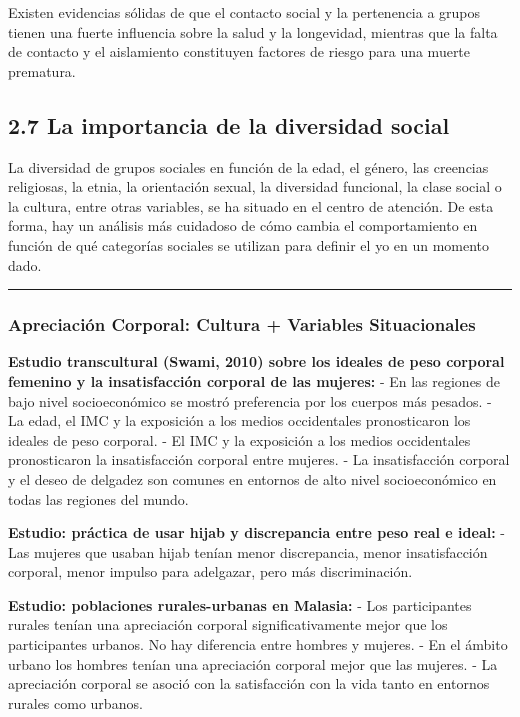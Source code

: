 \documentclass[
]{website}
\begin{document}
Existen evidencias sólidas de que el contacto social y la pertenencia a grupos tienen una fuerte influencia sobre la salud y la longevidad, mientras que la falta de contacto y el aislamiento constituyen factores de riesgo para una muerte prematura.

\subsection*{2.7 La importancia de la diversidad social}\label{subtema2_7}

La diversidad de grupos sociales en función de la edad, el género, las creencias religiosas, la etnia, la orientación sexual, la diversidad funcional, la clase social o la cultura, entre otras variables, se ha situado en el centro de atención. De esta forma, hay un análisis más cuidadoso de cómo cambia el comportamiento en función de qué categorías sociales se utilizan para definir el yo en un momento dado.

\begin{center}\rule{0.5\linewidth}{0.5pt}\end{center}

\subsubsection*{Apreciación Corporal: Cultura + Variables Situacionales}\label{apreciaciuxf3n-corporal-cultura-variables-situacionales}

\textbf{Estudio transcultural (Swami, 2010) sobre los ideales de peso corporal femenino y la insatisfacción corporal de las mujeres:}
- En las regiones de bajo nivel socioeconómico se mostró preferencia por los cuerpos más pesados.
- La edad, el IMC y la exposición a los medios occidentales pronosticaron los ideales de peso corporal.
- El IMC y la exposición a los medios occidentales pronosticaron la insatisfacción corporal entre mujeres.
- La insatisfacción corporal y el deseo de delgadez son comunes en entornos de alto nivel socioeconómico en todas las regiones del mundo.

\textbf{Estudio: práctica de usar hijab y discrepancia entre peso real e ideal:}
- Las mujeres que usaban hijab tenían menor discrepancia, menor insatisfacción corporal, menor impulso para adelgazar, pero más discriminación.

\textbf{Estudio: poblaciones rurales-urbanas en Malasia:}
- Los participantes rurales tenían una apreciación corporal significativamente mejor que los participantes urbanos. No hay diferencia entre hombres y mujeres.
- En el ámbito urbano los hombres tenían una apreciación corporal mejor que las mujeres.
- La apreciación corporal se asoció con la satisfacción con la vida tanto en entornos rurales como urbanos.
\end{document}

